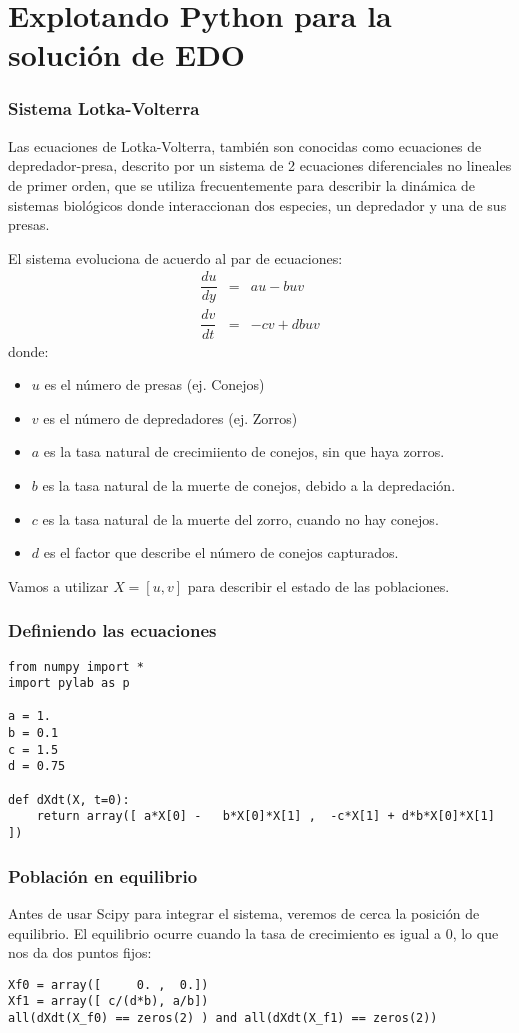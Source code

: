 \section{Explotando Python para la soluci\'{o}n de EDO}
\begin{frame}
\frametitle{Sistema Lotka-Volterra}
Las ecuaciones de Lotka-Volterra, tambi\'{e}n son conocidas como ecuaciones de depredador-presa, descrito por un sistema de 2 ecuaciones diferenciales no lineales de primer orden, que se utiliza frecuentemente para describir la din\'{a}mica de sistemas biol\'{o}gicos donde interaccionan dos especies, un depredador y una de sus presas.
\end{frame}
\begin{frame}
El sistema evoluciona de acuerdo al par de ecuaciones:
\begin{eqnarray*}
\dfrac{du}{dy} &=& au - buv \\
\dfrac{dv}{dt} &=& -cv + dbuv
\end{eqnarray*}
donde:
\fontsize{10}{10}\selectfont
\begin{itemize}
\item $u$ es el n\'{u}mero de presas (ej. Conejos)
\item $v$ es el n\'{u}mero de depredadores (ej. Zorros)
\item $a$ es la tasa natural de crecimiiento de conejos, sin que haya zorros.
\item $b$ es la tasa natural de la muerte de conejos, debido a la depredaci\'{o}n.
\item $c$ es la tasa natural de la muerte del zorro, cuando no hay conejos.
\item $d$ es el factor que describe el n\'{u}mero de conejos capturados.
\end{itemize}
\end{frame}
\begin{frame}
Vamos a utilizar $X = [u, v]$ para describir el estado de las poblaciones.
\end{frame}
\begin{frame}[fragile]
\frametitle{Definiendo las ecuaciones}
\begin{lstlisting}
from numpy import *
import pylab as p

a = 1.
b = 0.1
c = 1.5
d = 0.75

def dXdt(X, t=0):
    return array([ a*X[0] -   b*X[0]*X[1] ,  -c*X[1] + d*b*X[0]*X[1] ])
\end{lstlisting}
\end{frame}
\begin{frame}[fragile]
\frametitle{Poblaci\'{o}n en equilibrio}
Antes de usar Scipy para integrar el sistema, veremos de cerca la posici\'{o}n de equilibrio. El equilibrio ocurre cuando la tasa de crecimiento es igual a 0, lo que nos da dos puntos fijos:
\begin{lstlisting}
Xf0 = array([     0. ,  0.])
Xf1 = array([ c/(d*b), a/b])
all(dXdt(X_f0) == zeros(2) ) and all(dXdt(X_f1) == zeros(2))
\end{lstlisting}
\end{frame}
